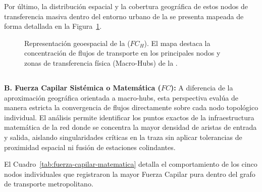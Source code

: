 Por último, la distribución espacial y la cobertura geográfica de estos nodos de
transferencia masiva dentro del entorno urbano de la \zmvm{} se presenta mapeada
de forma detallada en la Figura~\ref{fig:mapa-fuerza-capilar}.

\begin{figure}[H]
    \centering
    \caption[Mapa de Macro-Hubs y Fuerza Capilar Geográfica]{
    Representación geoespacial de la 
    ($FC_H$). El mapa destaca la concentración de flujos de transporte en los
    principales nodos y zonas de transferencia física (Macro-Hubs) de la \zmvm.}
    \label{fig:mapa-fuerza-capilar}
\end{figure}

\subsection{}
\label{subsec:fuerza-capilar-matematica}

\textbf{B. Fuerza Capilar Sistémica o Matemática ($FC$):} A diferencia de la
aproximación geográfica orientada a macro-hubs, esta perspectiva evalúa de manera
estricta la convergencia de flujos directamente sobre cada nodo topológico
individual. El análisis permite identificar los puntos exactos de la
infraestructura matemática de la red donde se concentra la mayor densidad de
aristas de entrada y salida, aislando singularidades críticas en la traza sin
aplicar tolerancias de proximidad espacial ni fusión de estaciones colindantes.

El Cuadro~\ref{tab:fuerza-capilar-matematica} detalla el comportamiento de los
cinco nodos individuales que registraron la mayor Fuerza Capilar pura dentro del
grafo de transporte metropolitano.

